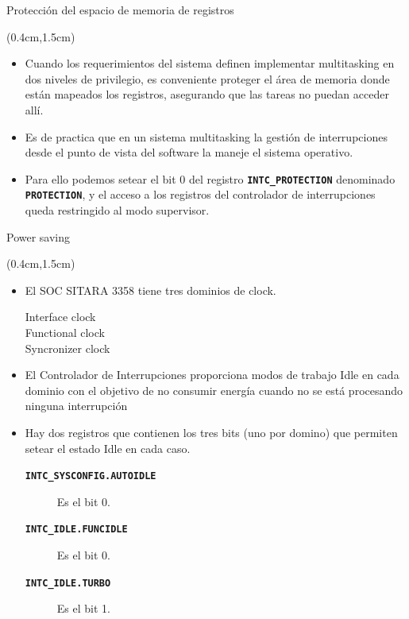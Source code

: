 \documentclass[usenames,table,xcolor={x11names},aspectratio=169]{beamer}
\begin{document}
\begin{frame}[t]{Protección del espacio de memoria de registros}
 \begin{textblock*}{\textwidth}(0.4cm,1.5cm)
  \begin{itemize}[<+(1)->]\justifying \parskip 0.18cm
   \item Cuando los requerimientos del sistema definen implementar multitasking en dos niveles de privilegio, es conveniente proteger el área de memoria donde están mapeados los registros, asegurando que las tareas no puedan acceder allí.
   \item Es de practica que en un sistema multitasking la gestión de interrupciones desde el punto de vista del software la maneje el sistema operativo.
   \item Para ello podemos setear el bit 0 del registro \textbf{\texttt{INTC\_PROTECTION}} denominado \textbf{\texttt{PROTECTION}}, y el acceso a los registros del controlador de interrupciones queda restringido al modo supervisor.
  \end{itemize}
 \end{textblock*}
\end{frame}

\begin{frame}[t]{Power saving}
 \begin{textblock*}{\textwidth}(0.4cm,1.5cm)
  \begin{itemize}[<+(1)->]\justifying \parskip 0.18cm
   \item El SOC SITARA 3358 tiene tres dominios de clock.
   \begin{description}
    \item[Interface clock]
    \item[Functional clock]
    \item[Syncronizer clock]
   \end{description}
   \item El Controlador de Interrupciones proporciona modos de trabajo Idle en cada dominio con el objetivo de no consumir energía cuando no se está procesando ninguna interrupción
   \item Hay dos registros que contienen los tres bits (uno por domino) que permiten setear el estado Idle en cada caso.
   \begin{description}
    \item[\textbf{\texttt{INTC\_SYSCONFIG.AUTOIDLE}}] Es el bit 0.
    \item[\textbf{\texttt{INTC\_IDLE.FUNCIDLE}}] Es el bit 0.
    \item[\textbf{\texttt{INTC\_IDLE.TURBO}}] Es el bit 1.
   \end{description}
  \end{itemize}
 \end{textblock*}
\end{frame}
\end{document}
